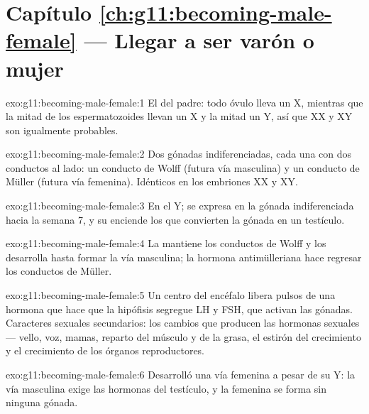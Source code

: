 \section*{Capítulo \ref{ch:g11:becoming-male-female} --- Llegar a ser varón o mujer}

\begin{solution}{exo:g11:becoming-male-female:1}
El del padre: todo óvulo lleva un X, mientras que la mitad de los
espermatozoides llevan un X y la mitad un Y, así que XX y XY son
igualmente probables.
\end{solution}

\begin{solution}{exo:g11:becoming-male-female:2}
Dos gónadas indiferenciadas, cada una con dos conductos al lado: un
conducto de Wolff (futura vía masculina) y un conducto de Müller
(futura vía femenina). Idénticos en los embriones XX y XY.
\end{solution}

\begin{solution}{exo:g11:becoming-male-female:3}
En el  Y; se expresa en la gónada indiferenciada hacia la
semana 7, y su  enciende los  que convierten la gónada en
un testículo.
\end{solution}

\begin{solution}{exo:g11:becoming-male-female:4}
La  mantiene los conductos de Wolff y los desarrolla hasta
formar la vía masculina; la hormona antimülleriana hace regresar los
conductos de Müller.
\end{solution}

\begin{solution}{exo:g11:becoming-male-female:5}
Un centro del encéfalo libera pulsos de una hormona que hace que la
hipófisis segregue LH y FSH, que activan las gónadas. Caracteres
sexuales secundarios: los cambios que producen las hormonas sexuales
--- vello, voz, mamas, reparto del músculo y de la grasa, el estirón
del crecimiento y el crecimiento de los órganos reproductores.
\end{solution}

\begin{solution}{exo:g11:becoming-male-female:6}
Desarrolló una vía femenina a pesar de su  Y: la vía masculina
exige las hormonas del testículo, y la femenina se forma sin ninguna
gónada.
\end{solution}

